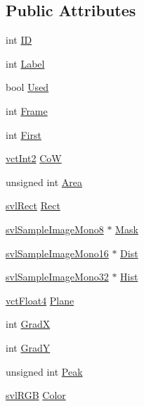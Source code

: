 \subsection*{Public Attributes}
\begin{DoxyCompactItemize}
\item 
int \hyperlink{classoni_plane_a8e124f1045514de627589b4d12c399de}{I\+D}
\item 
int \hyperlink{classoni_plane_ab36fafd8fdf3ffee9c6db1c75046698b}{Label}
\item 
bool \hyperlink{classoni_plane_a341b7fd56afc83f1c52a23339d2360af}{Used}
\item 
int \hyperlink{classoni_plane_a320042420f8fc8bb7e9627d20b03770a}{Frame}
\item 
int \hyperlink{classoni_plane_a2e074a995873b6ee68b72139a804f58e}{First}
\item 
\hyperlink{vct_fixed_size_vector_types_8h_add8c88eb6a432b15f14b866b9c35325f}{vct\+Int2} \hyperlink{classoni_plane_a9abe6029f64b043610124e75e9cb59e1}{Co\+W}
\item 
unsigned int \hyperlink{classoni_plane_a5fd10add329c5a691cdbeabe0544d0a7}{Area}
\item 
\hyperlink{structsvl_rect}{svl\+Rect} \hyperlink{classoni_plane_afd6f4fda85393983081d8fc25d3af0d5}{Rect}
\item 
\hyperlink{svl_sample_image_types_8h_a812ff42c7181179f558b68c43eeacee5}{svl\+Sample\+Image\+Mono8} $\ast$ \hyperlink{classoni_plane_aa8c339388f6941761ce99960758dff87}{Mask}
\item 
\hyperlink{svl_sample_image_types_8h_a0d4a39c480e3245d7f92d6699aa17848}{svl\+Sample\+Image\+Mono16} $\ast$ \hyperlink{classoni_plane_a94c9179a4a465e6af6b0933bd8830dd5}{Dist}
\item 
\hyperlink{svl_sample_image_types_8h_ac5d9d107eabb65b55f67d2a70ccf2cd6}{svl\+Sample\+Image\+Mono32} $\ast$ \hyperlink{classoni_plane_acc84136ccc7427a26e0ddd9b167ae503}{Hist}
\item 
\hyperlink{vct_fixed_size_vector_types_8h_a9bdca56ff054c73af41673cb9f5a4d94}{vct\+Float4} \hyperlink{classoni_plane_acde480a1ed54a84b6516b80f55149c08}{Plane}
\item 
int \hyperlink{classoni_plane_a0786845b82ff27e429fb4b20ae53b955}{Grad\+X}
\item 
int \hyperlink{classoni_plane_aacc36750673c9b1775dab107bcde5ae2}{Grad\+Y}
\item 
unsigned int \hyperlink{classoni_plane_a5b0c0a28d09f27c879464b4ddf67578e}{Peak}
\item 
\hyperlink{structsvl_r_g_b}{svl\+R\+G\+B} \hyperlink{classoni_plane_a4b3dddc3df25b2a09d40e0bfb6382bef}{Color}
\end{DoxyCompactItemize}


